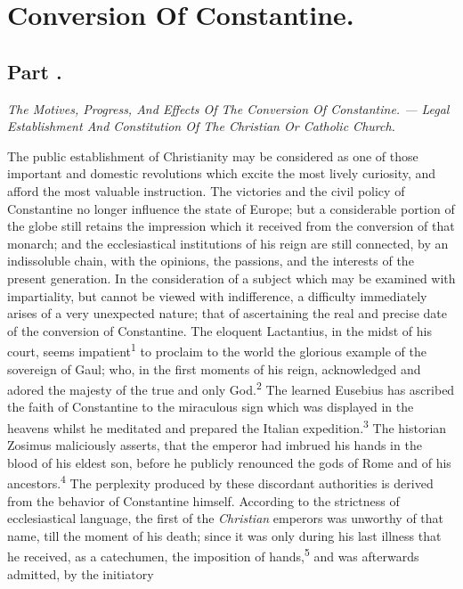 \chapter{Conversion Of Constantine.}
\section{Part \thesection.}

\textit{The Motives, Progress, And Effects Of The Conversion Of
Constantine. — Legal Establishment And Constitution Of The Christian Or
Catholic Church.}
\vspace{\onelineskip}

The public establishment of Christianity may be considered as one of
those important and domestic revolutions which excite the most lively
curiosity, and afford the most valuable instruction. The victories and
the civil policy of Constantine no longer influence the state of
Europe; but a considerable portion of the globe still retains the
impression which it received from the conversion of that monarch; and
the ecclesiastical institutions of his reign are still connected, by an
indissoluble chain, with the opinions, the passions, and the interests
of the present generation. In the consideration of a subject which may
be examined with impartiality, but cannot be viewed with indifference,
a difficulty immediately arises of a very unexpected nature; that of
ascertaining the real and precise date of the conversion of
Constantine. The eloquent Lactantius, in the midst of his court, seems
impatient\textsuperscript{1} to proclaim to the world the glorious example of the
sovereign of Gaul; who, in the first moments of his reign, acknowledged
and adored the majesty of the true and only God.\textsuperscript{2} The learned Eusebius
has ascribed the faith of Constantine to the miraculous sign which was
displayed in the heavens whilst he meditated and prepared the Italian
expedition.\textsuperscript{3} The historian Zosimus maliciously asserts, that the
emperor had imbrued his hands in the blood of his eldest son, before he
publicly renounced the gods of Rome and of his ancestors.\textsuperscript{4} The
perplexity produced by these discordant authorities is derived from the
behavior of Constantine himself. According to the strictness of
ecclesiastical language, the first of the \textit{Christian} emperors was
unworthy of that name, till the moment of his death; since it was only
during his last illness that he received, as a catechumen, the
imposition of hands,\textsuperscript{5} and was afterwards admitted, by the initiatory
